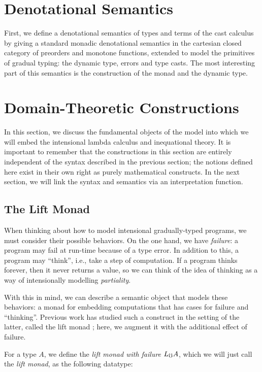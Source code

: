 \section{Denotational Semantics}

First, we define a denotational semantics of types and terms of the
cast calculus by giving a standard monadic denotational semantics in
the cartesian closed category of preorders and monotone functions,
extended to model the primitives of gradual typing: the dynamic type,
errors and type casts. The most interesting part of this semantics is
the construction of the monad and the dynamic type.



\section{Domain-Theoretic Constructions}\label{sec:domain-theory}

In this section, we discuss the fundamental objects of the model into which we will embed
the intensional lambda calculus and inequational theory. It is important to remember that
the constructions in this section are entirely independent of the syntax described in the
previous section; the notions defined here exist in their own right as purely mathematical
constructs. In the next section, we will link the syntax and semantics via an interpretation
function.

\subsection{The Lift Monad}

When thinking about how to model intensional gradually-typed programs, we must consider
their possible behaviors. On the one hand, we have \emph{failure}: a program may fail
at run-time because of a type error. In addition to this, a program may ``think'',
i.e., take a step of computation. If a program thinks forever, then it never returns a value,
so we can think of the idea of thinking as a way of intensionally modelling \emph{partiality}.

With this in mind, we can describe a semantic object that models these behaviors: a monad
for embedding computations that has cases for failure and ``thinking''.
Previous work has studied such a construct in the setting of the latter, called the lift
monad \cite{mogelberg-paviotti2016}; here, we augment it with the additional effect of failure.

For a type $A$, we define the \emph{lift monad with failure} $L_\mho A$, which we will just call
the \emph{lift monad}, as the following datatype:


